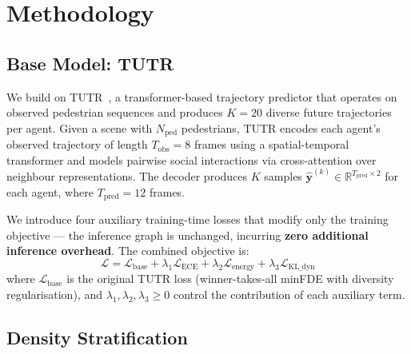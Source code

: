 


\section{Methodology}
\label{sec:method}

\subsection{Base Model: TUTR}
\label{sec:method:tutr}

We build on TUTR~\cite{shi2023tutr}, a transformer-based trajectory predictor
that operates on observed pedestrian sequences and produces $K=20$ diverse
future trajectories per agent. Given a scene with $N_{\text{ped}}$ pedestrians,
TUTR encodes each agent's observed trajectory of length $T_{\text{obs}} = 8$
frames using a spatial-temporal transformer and models pairwise social
interactions via cross-attention over neighbour representations. The decoder
produces $K$ samples $\hat{\mathbf{y}}^{(k)} \in \mathbb{R}^{T_{\text{pred}} \times 2}$
for each agent, where $T_{\text{pred}} = 12$ frames.

We introduce four auxiliary training-time losses that modify only the
training objective — the inference graph is unchanged, incurring \textbf{zero
additional inference overhead}. The combined objective is:
%
\begin{equation}
  \mathcal{L} = \mathcal{L}_{\text{base}} +
                \lambda_1 \mathcal{L}_{\text{ECE}} +
                \lambda_2 \mathcal{L}_{\text{energy}} +
                \lambda_3 \mathcal{L}_{\text{KL\_dyn}}
  \label{eq:combined}
\end{equation}
%
where $\mathcal{L}_{\text{base}}$ is the original TUTR loss (winner-takes-all
minFDE with diversity regularisation), and $\lambda_1, \lambda_2, \lambda_3 \geq 0$
control the contribution of each auxiliary term.

\subsection{Density Stratification}
\label{sec:method:density}

